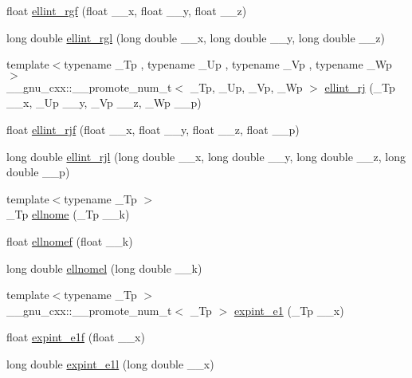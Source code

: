 \begin{DoxyCompactItemize}
float \hyperlink{namespace____gnu__cxx_a7a4ab348bf312a3425501ac8a3d16494}{ellint\+\_\+rgf} (float \+\_\+\+\_\+x, float \+\_\+\+\_\+y, float \+\_\+\+\_\+z)
\item 
long double \hyperlink{namespace____gnu__cxx_a563455d515ed845988552432108a21be}{ellint\+\_\+rgl} (long double \+\_\+\+\_\+x, long double \+\_\+\+\_\+y, long double \+\_\+\+\_\+z)
\item 
{\footnotesize template$<$typename \+\_\+\+Tp , typename \+\_\+\+Up , typename \+\_\+\+Vp , typename \+\_\+\+Wp $>$ }\\\+\_\+\+\_\+gnu\+\_\+cxx\+::\+\_\+\+\_\+promote\+\_\+num\+\_\+t$<$ \+\_\+\+Tp, \+\_\+\+Up, \+\_\+\+Vp, \+\_\+\+Wp $>$ \hyperlink{namespace____gnu__cxx_a61c6d7f5b930400eeb8de455667d4292}{ellint\+\_\+rj} (\+\_\+\+Tp \+\_\+\+\_\+x, \+\_\+\+Up \+\_\+\+\_\+y, \+\_\+\+Vp \+\_\+\+\_\+z, \+\_\+\+Wp \+\_\+\+\_\+p)
\item 
float \hyperlink{namespace____gnu__cxx_ace85b5190b04f57493878c5d672cfabd}{ellint\+\_\+rjf} (float \+\_\+\+\_\+x, float \+\_\+\+\_\+y, float \+\_\+\+\_\+z, float \+\_\+\+\_\+p)
\item 
long double \hyperlink{namespace____gnu__cxx_ab5405f1669b3ce8b560dc33aa5b97287}{ellint\+\_\+rjl} (long double \+\_\+\+\_\+x, long double \+\_\+\+\_\+y, long double \+\_\+\+\_\+z, long double \+\_\+\+\_\+p)
\item 
{\footnotesize template$<$typename \+\_\+\+Tp $>$ }\\\+\_\+\+Tp \hyperlink{namespace____gnu__cxx_a7bfb34f8b5c0ed7c72040f9cb7034bba}{ellnome} (\+\_\+\+Tp \+\_\+\+\_\+k)
\item 
float \hyperlink{namespace____gnu__cxx_ad3ba08e5843ea0ec2bb9ddde3033adff}{ellnomef} (float \+\_\+\+\_\+k)
\item 
long double \hyperlink{namespace____gnu__cxx_a0774570b24f654f8ae39e1865613a4e2}{ellnomel} (long double \+\_\+\+\_\+k)
\item 
{\footnotesize template$<$typename \+\_\+\+Tp $>$ }\\\+\_\+\+\_\+gnu\+\_\+cxx\+::\+\_\+\+\_\+promote\+\_\+num\+\_\+t$<$ \+\_\+\+Tp $>$ \hyperlink{namespace____gnu__cxx_a3696fc269b543a908d47bad7e98256e7}{expint\+\_\+e1} (\+\_\+\+Tp \+\_\+\+\_\+x)
\item 
float \hyperlink{namespace____gnu__cxx_ad6d75fcefac4a20b52f29d9b1bc3a57d}{expint\+\_\+e1f} (float \+\_\+\+\_\+x)
\item 
long double \hyperlink{namespace____gnu__cxx_a18cb55f0e83a9e369afaf5bae9e0772c}{expint\+\_\+e1l} (long double \+\_\+\+\_\+x)

\end{DoxyCompactItemize}
